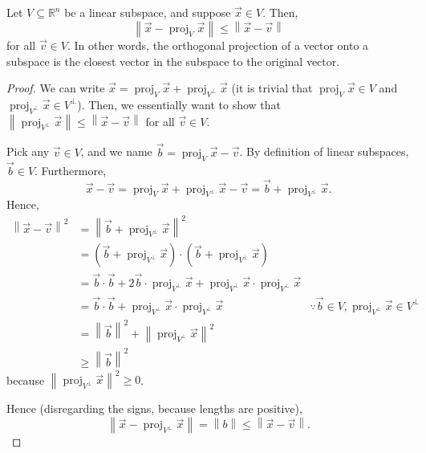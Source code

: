 \documentclass[]{book}
\DeclareMathOperator{\proj}{proj}
\newcommand{\R}{\ensuremath{\mathbb{R}}}
\begin{document}
\begin{theorem}
    \label{thm: orthogonal projection is the closest vector in subspace}
    Let $V \subseteq \R^n$ be a linear subspace, and suppose $\vec{x} \in V$. Then, 
    \[\left\|\vec{x} - \proj_V \vec{x}\right\| \leq \left\|\vec{x} - \vec{v}\right\|\] for all $\vec{v} \in V$. In other words, the orthogonal projection of a vector onto a subspace is the closest vector in the subspace to the original vector.
\begin{proof}
    We can write $\vec{x} = \proj_V \vec{x} + \proj_{V^{\perp}}\vec{x}$ (it is trivial that $\proj_V \vec{x} \in V$ and $\proj_{V^{\perp}} \vec{x} \in V^{\perp}$). Then, we essentially want to show that $\left\|\proj_{V^{\perp}}\vec{x}\right\| \leq \left\|\vec{x} - \vec{v}\right\|$ for all $\vec{v} \in V$.
    
    Pick any $\vec{v} \in V$, and we name $\vec{b} = \proj_V \vec{x} - \vec{v}$. By definition of linear subspaces, $\vec{b} \in V$. Furthermore, 
    \[\vec{x} - \vec{v} = \proj_V \vec{x} + \proj_{V^{\perp}}\vec{x} - \vec{v} = \vec{b} + \proj_{V^{\perp}}\vec{x}.\] Hence,
    \begin{align*}
        \left\|\vec{x} - \vec{v}\right\|^2 &= \left\|\vec{b} + \proj_{V^{\perp}}\vec{x}\right\|^2 \\
        &= \left(\vec{b} + \proj_{V^{\perp}}\vec{x}\right) \cdot \left(\vec{b} + \proj_{V^{\perp}}\vec{x}\right) \\
        &= \vec{b} \cdot \vec{b} + 2\vec{b}\cdot\proj_{V^{\perp}}\vec{x} + \proj_{V^{\perp}}\vec{x} \cdot \proj_{V^{\perp}}\vec{x} \\
        &= \vec{b} \cdot \vec{b} + \proj_{V^{\perp}}\vec{x} \cdot \proj_{V^{\perp}}\vec{x} & \because \vec{b} \in V, \proj_{V^{\perp}}\vec{x} \in V^{\perp} \\
        &= \left\|\vec{b}\right\|^2 + \left\|\proj_{V^{\perp}}\vec{x}\right\|^2 \\
        &\geq \left\|\vec{b}\right\|^2
    \end{align*}
    because $\left\|\proj_{V^{\perp}}\vec{x}\right\|^2 \geq 0$.
    
    Hence (disregarding the signs, because lengths are positive),
    \[\left\|\vec{x} -  \proj_{V^{\perp}}\vec{x}\right\| = \left\|b\right\| \leq \left\|\vec{x} - \vec{v}\right\|.\]
\end{proof}


\end{theorem}
\end{document}
